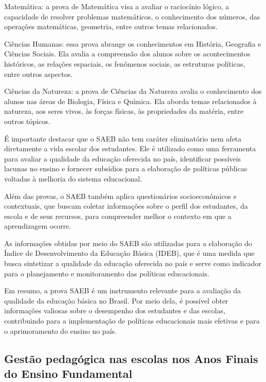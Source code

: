 Matemática: a prova de Matemática visa a avaliar o raciocínio lógico, a capacidade de resolver problemas matemáticos, o conhecimento dos números, das operações matemáticas, geometria, entre outros temas relacionados.

Ciências Humanas: essa prova abrange os conhecimentos em História, Geografia e Ciências Sociais. Ela avalia a compreensão dos alunos sobre os acontecimentos históricos, as relações espaciais, os fenômenos sociais, as estruturas políticas, entre outros aspectos.

Ciências da Natureza: a prova de Ciências da Natureza avalia o conhecimento dos alunos nas áreas de Biologia, Física e Química. Ela aborda temas relacionados à natureza, aos seres vivos, às forças físicas, às propriedades da matéria, entre outros tópicos.

É importante destacar que o SAEB não tem caráter eliminatório nem afeta diretamente a vida escolar dos estudantes. Ele é utilizado como uma ferramenta para avaliar a qualidade da educação oferecida no país, identificar possíveis lacunas no ensino e fornecer subsídios para a elaboração de políticas públicas voltadas à melhoria do sistema educacional.

Além das provas, o SAEB também aplica questionários socioeconômicos e contextuais, que buscam coletar informações sobre o perfil dos estudantes, da escola e de seus recursos, para compreender melhor o contexto em que a aprendizagem ocorre.

As informações obtidas por meio do SAEB são utilizadas para a elaboração do Índice de Desenvolvimento da Educação Básica (IDEB), que é uma medida que busca sintetizar a qualidade da educação oferecida no país e serve como indicador para o planejamento e monitoramento das políticas educacionais.

Em resumo, a prova SAEB é um instrumento relevante para a avaliação da
qualidade da educação básica no Brasil. Por meio dela, é possível obter
informações valiosas sobre o desempenho dos estudantes e das escolas,
contribuindo para a implementação de políticas educacionais mais
efetivas e para o aprimoramento do ensino no país.

\subsection{Gestão pedagógica nas escolas nos Anos Finais do Ensino
Fundamental}\label{gestuxe3o-pedaguxf3gica-nas-escolas-nos-anos-iniciais-do-ensino-fundamental}

